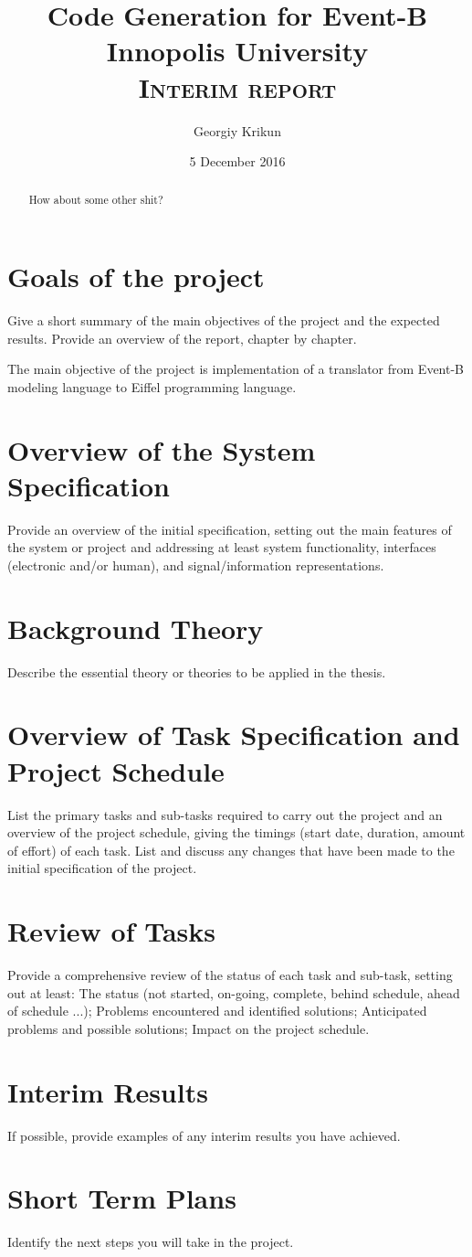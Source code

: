 \documentclass[12pt]{article}
\title{
	{Code Generation for Event-B}\\
	{\large Innopolis University}\\
	{\large \textsc{Interim report}}\\
}
\author{Georgiy Krikun}
\date{5 December 2016}
\begin{document}
\setcounter{secnumdepth}{0}

\maketitle
\pagebreak
\begin{abstract}
  How about some other shit?
\end{abstract}

\pagebreak
\tableofcontents

\pagebreak

\section{Goals of the project}
Give a short summary of the main objectives of the project and the expected results.
Provide an overview of the report, chapter by chapter.

The main objective of the project is implementation of a translator from Event-B
modeling language to Eiffel programming language.

\section{Overview of the System Specification}
Provide an overview of the initial specification, setting out the main features of the
system or project and addressing at least system functionality, interfaces (electronic
and/or human), and signal/information representations.

\section{Background Theory}
Describe the essential theory or theories to be applied in the thesis.

\section{Overview of Task Specification and Project Schedule}
List the primary tasks and sub-tasks required to carry out the project and an overview
of the project schedule, giving the timings (start date, duration, amount of effort) of
each task. List and discuss any changes that have been made to the initial
specification of the project.

\section{Review of Tasks}
Provide a comprehensive review of the status of each task and sub-task, setting out at
least:
  The status (not started, on-going, complete, behind schedule, ahead of schedule ...);
  Problems encountered and identified solutions;
  Anticipated problems and possible solutions;
  Impact on the project schedule.

\section{Interim Results}
If possible, provide examples of any interim results you have achieved.

\section{Short Term Plans}
Identify the next steps you will take in the project.
\end{document}
